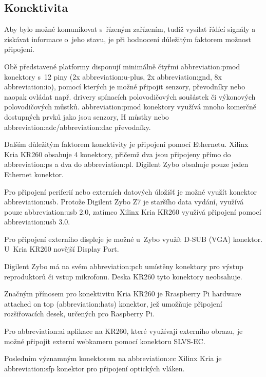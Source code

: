 \documentclass[a4paper, twoside, 11pt]{article}
\begin{document}
			\subsection{Konektivita}
					Aby bylo možné komunikovat s~řízeným zařízením, tudíž vysílat řídící signály a získávat informace o~jeho stavu, je při hodnocení důležitým faktorem možnost připojení.\par
					Obě představené platformy disponují minimálně čtyřmi \gls{abbreviation:pmod} konektory s~12 piny (2x \gls{abbreviation:u-plus}, 2x \gls{abbreviation:gnd}, 8x \gls{abbreviation:io}), pomocí kterých je možné připojit senzory, převodníky nebo naopak ovládat např. drivery spínacích polovodičových soušástek či výkonových polovodičových můstků. \gls{abbreviation:pmod} konektory využívá mnoho komerčně dostupných prvků jako jsou senzory, H můstky nebo \gls{abbreviation:adc}/\gls{abbreviation:dac} převodníky.\par
					Dalším důležitým faktorem konektivity je připojení pomocí Ethernetu. Xilinx Kria KR260 obsahuje 4 konektory, přičemž dva jsou připojeny přímo do \gls{abbreviation:ps} a dva do \gls{abbreviation:pl}. Digilent Zybo obsahuje pouze jeden Ethernet konektor.\par
					Pro připojení periferií nebo externích datových úložišť je možné využít konektor \gls{abbreviation:usb}. Protože Digilent Zybo Z7 je staršího data vydání, využívá pouze \gls{abbreviation:usb} 2.0, zatímco Xilinx Kria KR260 využívá připojení pomocí \gls{abbreviation:usb} 3.0.\par
					Pro připojení externího displeje je možné u~Zybo využít D-SUB (VGA) konektor. U~Kria KR260 novější Display Port.\par
					Digilent Zybo má na svém \gls{abbreviation:pcb} umístěny konektory pro výstup reproduktorů či vstup mikrofonu. Deska KR260 tyto konektory neobsahuje.\par
					Značným přínosem pro konektivitu Kria KR260 je Rraspberry Pi hardware attached on top (\gls{abbreviation:hats}) konektor, jež umožňuje připojení rozšiřovacích desek, určených pro Raspberry Pi.\par
					Pro \gls{abbreviation:ai} aplikace na KR260, které využívají externího obrazu, je možné připojit externí webkameru pomocí konektoru SLVS-EC.\par
					Posledním významným konektorem na \gls{abbreviation:cc} Xilinx Kria je \gls{abbreviation:sfp} konektor pro připojení optických vláken.
\end{document}
